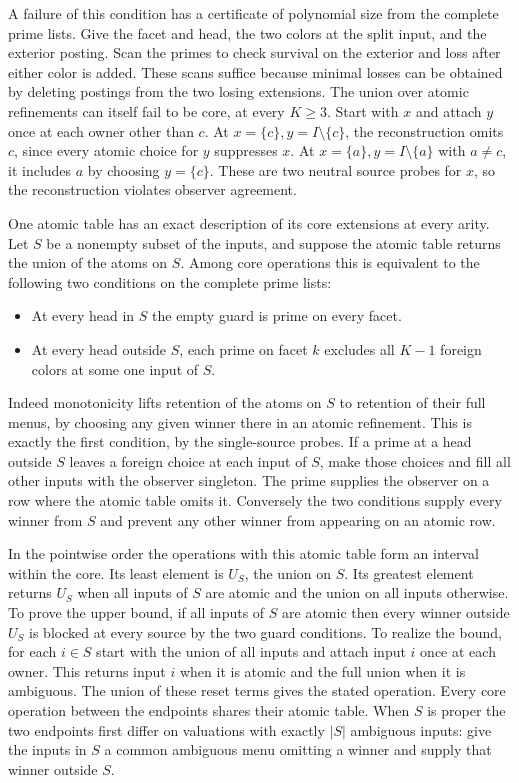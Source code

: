 A failure of this condition has a certificate of polynomial
size from the complete prime lists. Give the facet and head,
the two colors at the split input, and the exterior posting.
Scan the primes to check survival on the exterior and loss
after either color is added. These scans suffice because
minimal losses can be obtained by deleting postings from
the two losing extensions.
The union over atomic refinements can itself fail to be core,
at every $K\ge3$. Start with $x$ and attach $y$ once at each
owner other than $c$. At $x=\{c\},y=I\setminus\{c\}$, the
reconstruction omits $c$, since every atomic choice for $y$
suppresses $x$. At $x=\{a\},y=I\setminus\{a\}$ with
$a\ne c$, it includes $a$ by choosing $y=\{c\}$.
These are two neutral source probes for $x$, so the
reconstruction violates observer agreement.

One atomic table has an exact description of its core
extensions at every arity. Let $S$ be a nonempty subset of the
inputs, and suppose the atomic table returns the union of the
atoms on $S$. Among core operations this is equivalent to
the following two conditions on the complete prime lists:
\begin{itemize}
\item At every head in $S$ the empty guard is prime on every
facet.
\item At every head outside $S$, each prime on facet $k$
excludes all $K-1$ foreign colors at some one input of $S$.
\end{itemize}
Indeed monotonicity lifts retention of the atoms on $S$ to
retention of their full menus, by choosing any given winner
there in an atomic refinement. This is exactly the first
condition, by the single-source probes. If a prime at a head
outside $S$ leaves a foreign choice at each input of $S$,
make those choices and fill all other inputs with the
observer singleton. The prime supplies the observer on a
row where the atomic table omits it. Conversely the two
conditions supply every winner from $S$ and prevent any
other winner from appearing on an atomic row.

In the pointwise order the operations with this atomic table
form an interval within the core. Its least element is
$U_S$, the union on $S$. Its greatest element returns $U_S$
when all inputs of $S$ are atomic and the union on all inputs
otherwise. To prove the upper bound, if all inputs of $S$
are atomic then every winner outside $U_S$ is blocked at
every source by the two guard conditions. To realize the
bound, for each $i\in S$ start with the union of all inputs
and attach input $i$ once at each owner. This returns input
$i$ when it is atomic and the full union when it is ambiguous.
The union of these reset terms gives the stated operation.
Every core operation between the endpoints shares their
atomic table. When $S$ is proper the two endpoints first
differ on valuations with exactly $|S|$ ambiguous inputs:
give the inputs in $S$ a common ambiguous menu omitting a
winner and supply that winner outside $S$.

